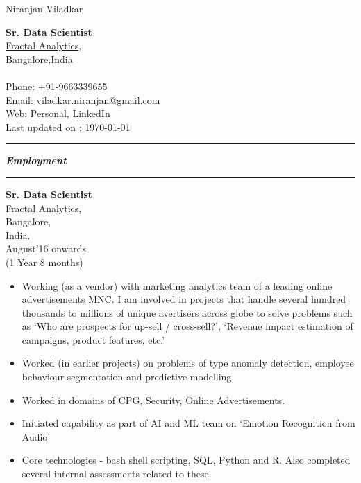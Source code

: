 \documentclass[10pt]{article}
\begin{document}
{\Huge {\sc Niranjan Viladkar}}
\hfill
\parbox{180pt}{\raggedleft
	{\bf Sr. Data Scientist} \\
	\href{http://www.fractalanalytics.com/} {Fractal Analytics}, \\
	Bangalore,{\sc India} \\
	\vspace{5pt} \noindent \\
	Phone: +91-9663339655 \\
	Email: \href{mailto:viladkar.niranjan@gmail.com}{viladkar.niranjan@gmail.com} \\
	Web: \href{https://sites.google.com/site/niranjanviladkar/} {Personal}, \href{https://www.linkedin.com/in/niranjan-viladkar-47aa3139/}{LinkedIn} \\
	Last updated on : \today
}
\vspace{15pt}
\hrule
\vspace{5pt}
{\Large \bfseries \slshape \sc Employment}
\vspace{5pt}
\hrule
\vspace{10pt}

\parbox{90pt}{\raggedright
	{\bf Sr. Data Scientist} \\
	Fractal Analytics, \\
	Bangalore,\\
	India. \\
	August'16 onwards  \\
	(1 Year 8 months)
}
\parbox{390pt}{
	\begin{itemize}
	\item Working (as a vendor) with marketing analytics team of a leading online advertisements MNC.
              I am involved in projects that handle several hundred thousands to millions of unique avertisers across globe to solve problems 
              such as `Who are prospects for up-sell / cross-sell?', `Revenue impact estimation of campaigns, product features, etc.' 
        \item Worked (in earlier projects) on problems of type anomaly detection, employee behaviour segmentation and predictive modelling.
	\item Worked in domains of CPG, Security, Online Advertisements.
	\item Initiated capability as part of AI and ML team on `Emotion Recognition from Audio'
        \item Core technologies - bash shell scripting, SQL, Python and R. Also completed several internal assessments related to these.
	\end{itemize}
}
\vspace{10pt}
\end{document}
